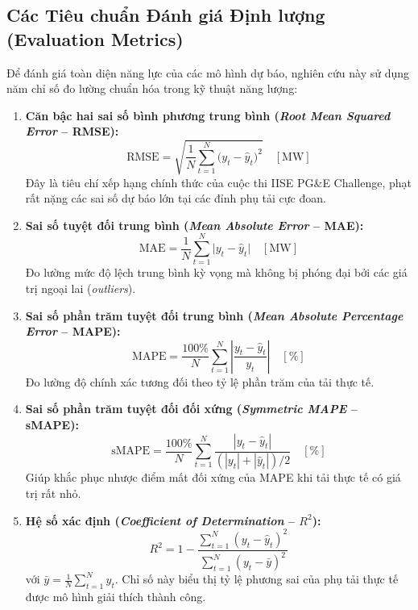 \subsection{Các Tiêu chuẩn Đánh giá Định lượng (Evaluation Metrics)}
Để đánh giá toàn diện năng lực của các mô hình dự báo, nghiên cứu này sử dụng năm chỉ số đo lường chuẩn hóa trong kỹ thuật năng lượng:
\begin{enumerate}
    \item \textbf{Căn bậc hai sai số bình phương trung bình (\textit{Root Mean Squared Error} -- RMSE):}
    \begin{equation}
        \text{RMSE} = \sqrt{\frac{1}{N} \sum_{t=1}^N \big(y_t - \hat{y}_t\big)^2} \quad [\text{MW}]
    \end{equation}
    Đây là tiêu chí xếp hạng chính thức của cuộc thi IISE PG\&E Challenge, phạt rất nặng các sai số dự báo lớn tại các đỉnh phụ tải cực đoan.
    \item \textbf{Sai số tuyệt đối trung bình (\textit{Mean Absolute Error} -- MAE):}
    \begin{equation}
        \text{MAE} = \frac{1}{N} \sum_{t=1}^N \big|y_t - \hat{y}_t\big| \quad [\text{MW}]
    \end{equation}
    Đo lường mức độ lệch trung bình kỳ vọng mà không bị phóng đại bởi các giá trị ngoại lai (\textit{outliers}).
    \item \textbf{Sai số phần trăm tuyệt đối trung bình (\textit{Mean Absolute Percentage Error} -- MAPE):}
    \begin{equation}
        \text{MAPE} = \frac{100\%}{N} \sum_{t=1}^N \left| \frac{y_t - \hat{y}_t}{y_t} \right| \quad [\%]
    \end{equation}
    Đo lường độ chính xác tương đối theo tỷ lệ phần trăm của tải thực tế.
    \item \textbf{Sai số phần trăm tuyệt đối đối xứng (\textit{Symmetric MAPE} -- sMAPE):}
    \begin{equation}
        \text{sMAPE} = \frac{100\%}{N} \sum_{t=1}^N \frac{|y_t - \hat{y}_t|}{(|y_t| + |\hat{y}_t|)/2} \quad [\%]
    \end{equation}
    Giúp khắc phục nhược điểm mất đối xứng của MAPE khi tải thực tế có giá trị rất nhỏ.
    \item \textbf{Hệ số xác định (\textit{Coefficient of Determination} -- $R^2$):}
    \begin{equation}
        R^2 = 1 - \frac{\sum_{t=1}^N (y_t - \hat{y}_t)^2}{\sum_{t=1}^N (y_t - \bar{y})^2}
    \end{equation}
    với $\bar{y} = \frac{1}{N}\sum_{t=1}^N y_t$. Chỉ số này biểu thị tỷ lệ phương sai của phụ tải thực tế được mô hình giải thích thành công.
\end{enumerate}

